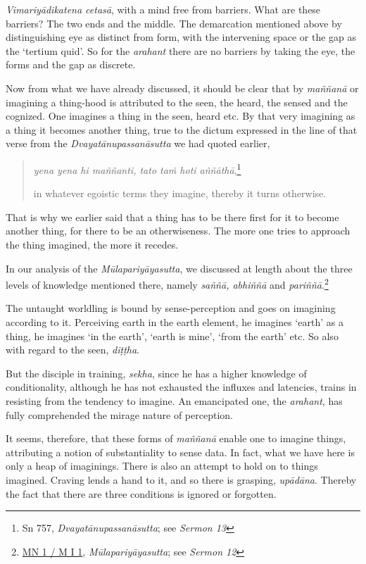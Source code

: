 \emph{Vimariyādikatena cetasā}, with a mind free from barriers. What are these barriers? The two ends and the middle. The demarcation mentioned above by distinguishing eye as distinct from form, with the intervening space or the gap as the `tertium quid'. So for the \emph{arahant} there are no barriers by taking the eye, the forms and the gap as discrete.

Now from what we have already discussed, it should be clear that by \emph{maññanā} or imagining a thing-hood is attributed to the seen, the heard, the sensed and the cognized. One imagines a thing in the seen, heard etc. By that very imagining as a thing it becomes another thing, true to the dictum expressed in the line of that verse from the \emph{Dvayatānupassanāsutta} we had quoted earlier,

\begin{quote}
\emph{yena yena hi maññanti, tato taṁ hoti aññāthā},\footnote{Sn 757, \emph{Dvayatānupassanāsutta}; see \emph{Sermon 13}}

in whatever egoistic terms they imagine, thereby it turns otherwise.
\end{quote}

That is why we earlier said that a thing has to be there first for it to become another thing, for there to be an otherwiseness. The more one tries to approach the thing imagined, the more it recedes.

In our analysis of the \emph{Mūlapariyāyasutta}, we discussed at length about the three levels of knowledge mentioned there, namely \emph{saññā, abhiññā} and \emph{pariññā}.\footnote{\href{https://suttacentral.net/mn1/pli/ms}{MN 1 / M I 1}, \emph{Mūlapariyāyasutta}; see \emph{Sermon 12}}

The untaught worldling is bound by sense-perception and goes on imagining according to it. Perceiving earth in the earth element, he imagines `earth' as a thing, he imagines `in the earth', `earth is mine', `from the earth' etc. So also with regard to the seen, \emph{diṭṭha}.

But the disciple in training, \emph{sekha}, since he has a higher knowledge of conditionality, although he has not exhausted the influxes and latencies, trains in resisting from the tendency to imagine. An emancipated one, the \emph{arahant}, has fully comprehended the mirage nature of perception.

It seems, therefore, that these forms of \emph{maññanā} enable one to imagine things, attributing a notion of substantiality to sense data. In fact, what we have here is only a heap of imaginings. There is also an attempt to hold on to things imagined. Craving lends a hand to it, and so there is grasping, \emph{upādāna}. Thereby the fact that there are three conditions is ignored or forgotten.

